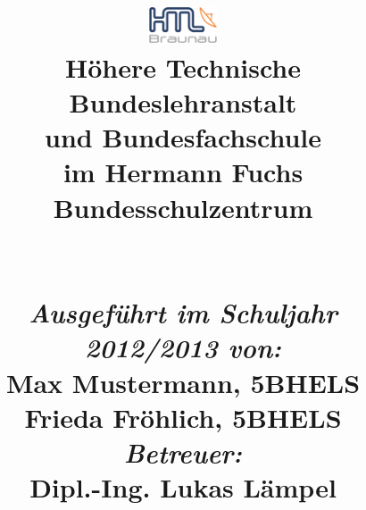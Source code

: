 
\begin{titlepage}
\title{
%
{\includegraphics[width=0.15\textwidth]{./includes/htl_c_cmyk_rein.pdf}}
%
\\{\normalsize \textbf{Höhere Technische Bundeslehranstalt}}
\\[-0.4em] {\normalsize \textbf{und Bundesfachschule}}
\\[-0.4em] {\normalsize im Hermann Fuchs Bundesschulzentrum}
%
\\\vspace{3cm}{ \textbf{\htlArbeitsthema}}
%
\\\vspace{0.5cm} {\Large \textsc{\htlArbeit}}
%
\\\vspace{5cm}
%
{\normalsize \emph{Ausgeführt im Schuljahr 2012/2013 von:}}
\\{\normalsize Max Mustermann, 5BHELS}
\\[-0.4em] {\normalsize Frieda Fröhlich, 5BHELS}
\\[1.0em] {\normalsize \emph{Betreuer:}}
\\{\normalsize Dipl.-Ing. Lukas Lämpel}
}		
%
\maketitle
\end{titlepage}
\restoregeometry
\pagebreak
